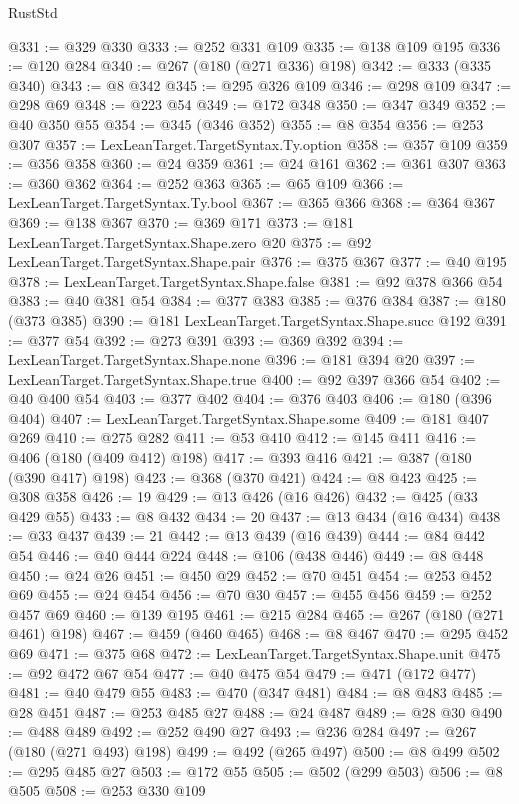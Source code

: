 \begin{lexlean}{RustStd}
\begin{coremodule}
@331 := @329 @330
@333 := @252 @331 @109
@335 := @138 @109 @195
@336 := @120 @284
@340 := @267 (@180 (@271 @336) @198)
@342 := @333 (@335 @340)
@343 := @8 @342
@345 := @295 @326 @109
@346 := @298 @109
@347 := @298 @69
@348 := @223 @54
@349 := @172 @348
@350 := @347 @349
@352 := @40 @350 @55
@354 := @345 (@346 @352)
@355 := @8 @354
@356 := @253 @307
@357 := LexLeanTarget.TargetSyntax.Ty.option
@358 := @357 @109
@359 := @356 @358
@360 := @24 @359
@361 := @24 @161
@362 := @361 @307
@363 := @360 @362
@364 := @252 @363
@365 := @65 @109
@366 := LexLeanTarget.TargetSyntax.Ty.bool
@367 := @365 @366
@368 := @364 @367
@369 := @138 @367
@370 := @369 @171
@373 := @181 LexLeanTarget.TargetSyntax.Shape.zero @20
@375 := @92 LexLeanTarget.TargetSyntax.Shape.pair
@376 := @375 @367
@377 := @40 @195
@378 := LexLeanTarget.TargetSyntax.Shape.false
@381 := @92 @378 @366 @54
@383 := @40 @381 @54
@384 := @377 @383
@385 := @376 @384
@387 := @180 (@373 @385)
@390 := @181 LexLeanTarget.TargetSyntax.Shape.succ @192
@391 := @377 @54
@392 := @273 @391
@393 := @369 @392
@394 := LexLeanTarget.TargetSyntax.Shape.none
@396 := @181 @394 @20
@397 := LexLeanTarget.TargetSyntax.Shape.true
@400 := @92 @397 @366 @54
@402 := @40 @400 @54
@403 := @377 @402
@404 := @376 @403
@406 := @180 (@396 @404)
@407 := LexLeanTarget.TargetSyntax.Shape.some
@409 := @181 @407 @269
@410 := @275 @282
@411 := @53 @410
@412 := @145 @411
@416 := @406 (@180 (@409 @412) @198)
@417 := @393 @416
@421 := @387 (@180 (@390 @417) @198)
@423 := @368 (@370 @421)
@424 := @8 @423
@425 := @308 @358
@426 := 19
@429 := @13 @426 (@16 @426)
@432 := @425 (@33 @429 @55)
@433 := @8 @432
@434 := 20
@437 := @13 @434 (@16 @434)
@438 := @33 @437
@439 := 21
@442 := @13 @439 (@16 @439)
@444 := @84 @442 @54
@446 := @40 @444 @224
@448 := @106 (@438 @446)
@449 := @8 @448
@450 := @24 @26
@451 := @450 @29
@452 := @70 @451
@454 := @253 @452 @69
@455 := @24 @454
@456 := @70 @30
@457 := @455 @456
@459 := @252 @457 @69
@460 := @139 @195
@461 := @215 @284
@465 := @267 (@180 (@271 @461) @198)
@467 := @459 (@460 @465)
@468 := @8 @467
@470 := @295 @452 @69
@471 := @375 @68
@472 := LexLeanTarget.TargetSyntax.Shape.unit
@475 := @92 @472 @67 @54
@477 := @40 @475 @54
@479 := @471 (@172 @477)
@481 := @40 @479 @55
@483 := @470 (@347 @481)
@484 := @8 @483
@485 := @28 @451
@487 := @253 @485 @27
@488 := @24 @487
@489 := @28 @30
@490 := @488 @489
@492 := @252 @490 @27
@493 := @236 @284
@497 := @267 (@180 (@271 @493) @198)
@499 := @492 (@265 @497)
@500 := @8 @499
@502 := @295 @485 @27
@503 := @172 @55
@505 := @502 (@299 @503)
@506 := @8 @505
@508 := @253 @330 @109

\end{coremodule}
\end{lexlean}
